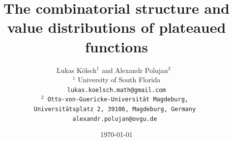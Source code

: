 \documentclass[11pt]{article}
\theoremstyle{plain}
\theoremstyle{definition}
\numberwithin{theorem}{section}
\numberwithin{equation}{section}
\numberwithin{table}{section}
\numberwithin{figure}{section}
\begin{document}
\title{The combinatorial structure and value distributions of plateaued functions}


\author{Lukas K\"olsch$^1$ and Alexandr Polujan$^2$ \vspace{0.4cm} \ \\
$^1$ University of South Florida \\\tt lukas.koelsch.math@gmail.com\vspace{0.4cm}\\
$^2$ Otto-von-Guericke-Universit\"{a}t Magdeburg,\ \\ Universit\"{a}tsplatz 2, 39106, Magdeburg, Germany\ \\ \tt alexandr.polujan@ovgu.de
}

\date{\today}
\maketitle
\end{document}
